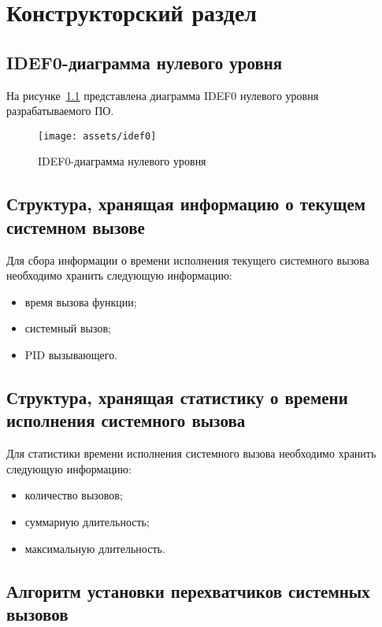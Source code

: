 \chapter{Конструкторский раздел}

\section{IDEF0-диаграмма нулевого уровня}

На рисунке~\ref{img:idef0} представлена диаграмма IDEF0 нулевого уровня разрабатываемого ПО.

\begin{figure}[h!]
    \centering
    \texttt{[image: assets/idef0]}
    \caption{IDEF0-диаграмма нулевого уровня}
    \label{img:idef0}
\end{figure}

\section{Структура, хранящая информацию о текущем системном вызове}

Для сбора информации о времени исполнения текущего системного вызова необходимо хранить следующую информацию:

\begin{itemize}
	\item время вызова функции;
	\item системный вызов;
	\item PID вызывающего.
\end{itemize}

\newpage

\section{Структура, хранящая статистику о времени исполнения системного вызова}

Для статистики времени исполнения системного вызова необходимо хранить следующую информацию:

\begin{itemize}
	\item количество вызовов;
	\item суммарную длительность;
	\item максимальную длительность.
\end{itemize}

\section{Алгоритм установки перехватчиков системных вызовов}

